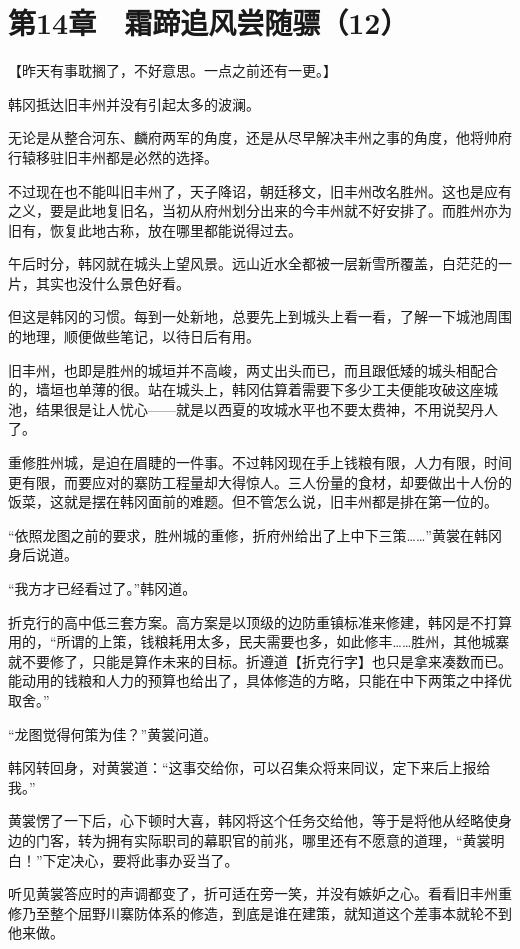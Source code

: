 \section{第14章　霜蹄追风尝随骠（12）}

【昨天有事耽搁了，不好意思。一点之前还有一更。】

韩冈抵达旧丰州并没有引起太多的波澜。

无论是从整合河东、麟府两军的角度，还是从尽早解决丰州之事的角度，他将帅府行辕移驻旧丰州都是必然的选择。

不过现在也不能叫旧丰州了，天子降诏，朝廷移文，旧丰州改名胜州。这也是应有之义，要是此地复旧名，当初从府州划分出来的今丰州就不好安排了。而胜州亦为旧有，恢复此地古称，放在哪里都能说得过去。

午后时分，韩冈就在城头上望风景。远山近水全都被一层新雪所覆盖，白茫茫的一片，其实也没什么景色好看。

但这是韩冈的习惯。每到一处新地，总要先上到城头上看一看，了解一下城池周围的地理，顺便做些笔记，以待日后有用。

旧丰州，也即是胜州的城垣并不高峻，两丈出头而已，而且跟低矮的城头相配合的，墙垣也单薄的很。站在城头上，韩冈估算着需要下多少工夫便能攻破这座城池，结果很是让人忧心——就是以西夏的攻城水平也不要太费神，不用说契丹人了。

重修胜州城，是迫在眉睫的一件事。不过韩冈现在手上钱粮有限，人力有限，时间更有限，而要应对的寨防工程量却大得惊人。三人份量的食材，却要做出十人份的饭菜，这就是摆在韩冈面前的难题。但不管怎么说，旧丰州都是排在第一位的。

“依照龙图之前的要求，胜州城的重修，折府州给出了上中下三策……”黄裳在韩冈身后说道。

“我方才已经看过了。”韩冈道。

折克行的高中低三套方案。高方案是以顶级的边防重镇标准来修建，韩冈是不打算用的，“所谓的上策，钱粮耗用太多，民夫需要也多，如此修丰……胜州，其他城寨就不要修了，只能是算作未来的目标。折遵道【折克行字】也只是拿来凑数而已。能动用的钱粮和人力的预算也给出了，具体修造的方略，只能在中下两策之中择优取舍。”

“龙图觉得何策为佳？”黄裳问道。

韩冈转回身，对黄裳道：“这事交给你，可以召集众将来同议，定下来后上报给我。”

黄裳愣了一下后，心下顿时大喜，韩冈将这个任务交给他，等于是将他从经略使身边的门客，转为拥有实际职司的幕职官的前兆，哪里还有不愿意的道理，“黄裳明白！”下定决心，要将此事办妥当了。

听见黄裳答应时的声调都变了，折可适在旁一笑，并没有嫉妒之心。看看旧丰州重修乃至整个屈野川寨防体系的修造，到底是谁在建策，就知道这个差事本就轮不到他来做。

